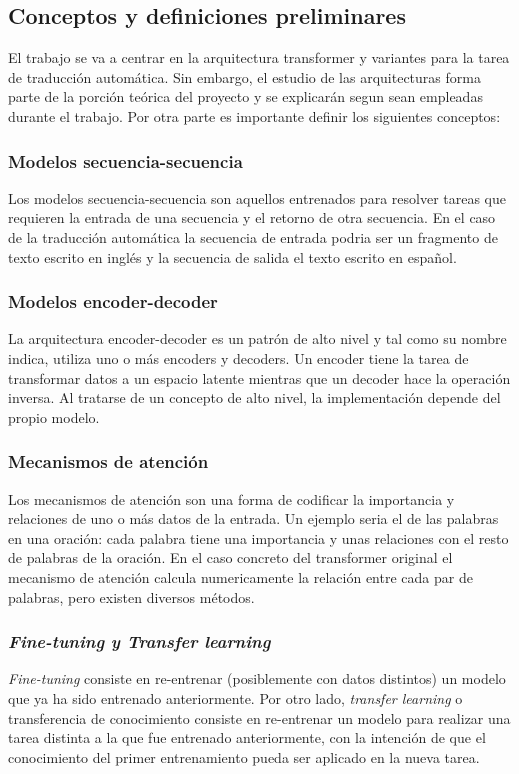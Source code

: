 \subsection{Conceptos y definiciones preliminares}
El trabajo se va a centrar en la arquitectura transformer \cite{Vaswani2017Jun} y variantes 
para la tarea de traducción automática. Sin embargo, el estudio de las arquitecturas
forma parte de la porción teórica del proyecto y se explicarán segun sean empleadas durante el trabajo.
Por otra parte es importante definir los siguientes conceptos:

\subsubsection*{Modelos secuencia-secuencia}
Los modelos secuencia-secuencia son aquellos entrenados para
resolver tareas que requieren la entrada de una secuencia y el retorno de
otra secuencia.
En el caso de la traducción automática la secuencia de entrada podria ser
un fragmento de texto escrito en inglés y la secuencia de salida el texto
escrito en español.

\subsubsection*{Modelos encoder-decoder}
La arquitectura encoder-decoder es un patrón de alto nivel y tal como su nombre indica,
utiliza uno o más encoders y decoders.
Un encoder tiene la tarea de transformar datos a un espacio latente
mientras que un decoder hace la operación inversa. Al tratarse de un concepto de alto nivel, la
implementación depende del propio modelo.

\subsubsection*{Mecanismos de atención}
Los mecanismos de atención son una forma de codificar la importancia y relaciones de uno o más
datos de la entrada. Un ejemplo seria el de las palabras en una oración: cada palabra tiene una
importancia y unas relaciones con el resto de palabras de la oración.
En el caso concreto del transformer original \cite{Vaswani2017Jun} el mecanismo de atención
calcula numericamente la relación entre cada par de palabras, pero existen diversos métodos.

\subsubsection*{\textit{Fine-tuning y Transfer learning}}
\textit{Fine-tuning} consiste en re-entrenar (posiblemente con datos distintos) un modelo que ya ha
sido entrenado anteriormente. Por otro lado, \textit{transfer learning} o transferencia de conocimiento
consiste en re-entrenar un modelo para realizar una tarea distinta a la que fue entrenado anteriormente,
con la intención de que el conocimiento del primer entrenamiento pueda ser aplicado en la nueva tarea.

